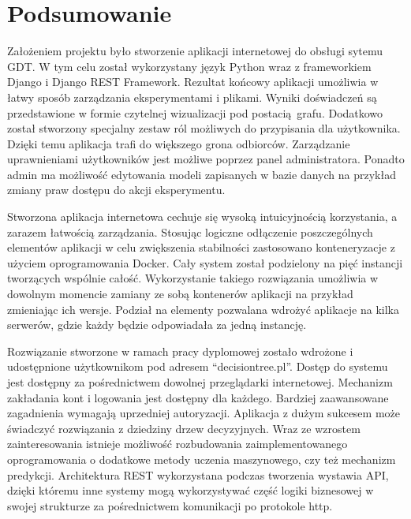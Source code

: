 \chapter*{Podsumowanie}
Założeniem projektu było stworzenie aplikacji internetowej do obsługi sytemu GDT. W tym celu został wykorzystany język Python wraz z frameworkiem Django i Django REST Framework. Rezultat końcowy aplikacji umożliwia w łatwy sposób zarządzania eksperymentami i plikami. Wyniki doświadczeń są przedstawione w formie czytelnej wizualizacji pod postacią grafu. Dodatkowo został stworzony specjalny zestaw ról możliwych do przypisania dla użytkownika. Dzięki temu aplikacja trafi do większego grona odbiorców. Zarządzanie uprawnieniami użytkowników jest możliwe poprzez panel administratora. Ponadto admin ma możliwość edytowania modeli zapisanych w bazie danych na przykład zmiany praw dostępu do akcji eksperymentu. 

Stworzona aplikacja internetowa cechuje się wysoką intuicyjnością korzystania, a zarazem łatwością zarządzania. Stosując logiczne odłączenie poszczególnych elementów aplikacji w celu zwiększenia stabilności zastosowano konteneryzacje z użyciem oprogramowania Docker. Cały system został podzielony na pięć instancji tworzących wspólnie całość. Wykorzystanie takiego rozwiązania umożliwia w dowolnym momencie zamiany ze sobą kontenerów aplikacji na przykład zmieniając ich wersje. Podział na elementy pozwalana wdrożyć aplikacje na kilka serwerów, gdzie każdy będzie odpowiadała za jedną instancję. 

Rozwiązanie stworzone w ramach pracy dyplomowej zostało wdrożone i udostępnione użytkownikom pod adresem \enquote{decisiontree.pl}. Dostęp do systemu jest dostępny za pośrednictwem dowolnej przeglądarki internetowej. Mechanizm zakładania kont i logowania jest dostępny dla każdego. Bardziej zaawansowane zagadnienia wymagają uprzedniej autoryzacji. Aplikacja z dużym sukcesem może świadczyć rozwiązania z dziedziny drzew decyzyjnych. Wraz ze wzrostem zainteresowania istnieje możliwość rozbudowania zaimplementowanego oprogramowania o dodatkowe metody uczenia maszynowego, czy też mechanizm predykcji. Architektura REST wykorzystana podczas tworzenia wystawia API, dzięki któremu inne systemy mogą wykorzystywać część logiki biznesowej w swojej strukturze za pośrednictwem komunikacji po protokole http.